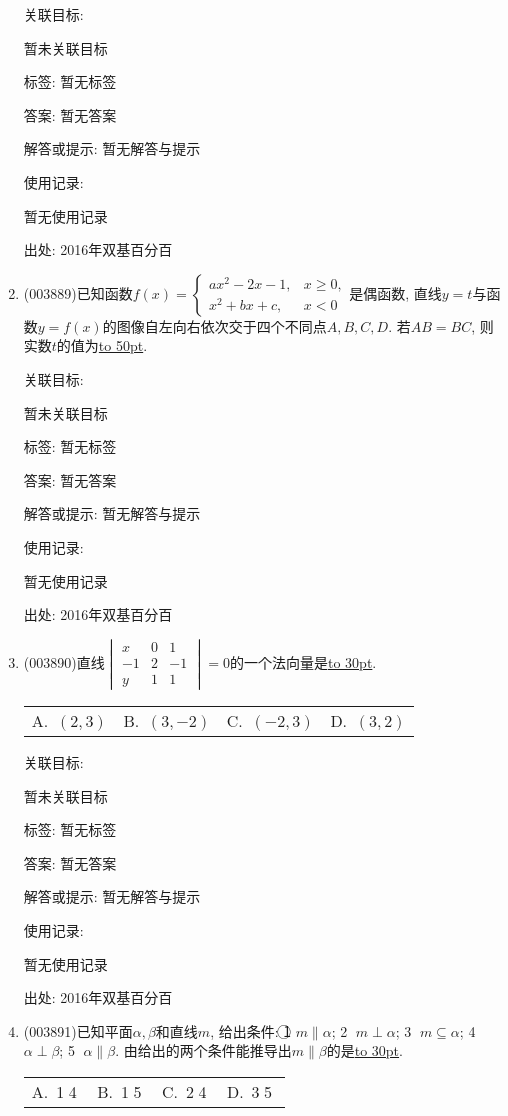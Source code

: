 \documentclass[10pt,a4paper]{article}
\newcommand{\blank}[1]{\underline{\hbox to #1pt{}}}
\newcommand{\fourch}[4]{\par\begin{tabular}{p{.23\textwidth}p{.23\textwidth}p{.23\textwidth}p{.23\textwidth}}
A.~#1 &B.~#2& C.~#3& D.~#4
\end{tabular}}
\begin{document}
\begin{enumerate}[1.]
关联目标:

暂未关联目标



标签: 暂无标签

答案: 暂无答案

解答或提示: 暂无解答与提示

使用记录:

暂无使用记录


出处: 2016年双基百分百
\item { (003889)}已知函数$f(x)=\begin{cases}ax^2-2x-1, & x\ge 0,\\ x^2+bx+c, & x<0\end{cases}$是偶函数, 直线$y=t$与函数$y=f(x)$的图像自左向右依次交于四个不同点$A,B,C,D$. 若$AB=BC$, 则实数$t$的值为\blank{50}.


关联目标:

暂未关联目标



标签: 暂无标签

答案: 暂无答案

解答或提示: 暂无解答与提示

使用记录:

暂无使用记录


出处: 2016年双基百分百
\item { (003890)}直线$\begin{vmatrix}
x & 0 & 1\\-1 & 2 & -1\\y & 1 & 1
\end{vmatrix}=0$的一个法向量是\blank{30}.
\fourch{$(2,3)$}{$(3,-2)$}{$(-2,3)$}{$(3,2)$}


关联目标:

暂未关联目标



标签: 暂无标签

答案: 暂无答案

解答或提示: 暂无解答与提示

使用记录:

暂无使用记录


出处: 2016年双基百分百
\item { (003891)}已知平面$\alpha,\beta$和直线$m$, 给出条件: \textcircled{1} $m\parallel \alpha$; \textcircled{2} $m\perp \alpha$; \textcircled{3} $m\subseteq \alpha$; \textcircled{4} $\alpha\perp \beta$; \textcircled{5} $\alpha\parallel\beta$. 由给出的两个条件能推导出$m\parallel \beta$的是\blank{30}.
\fourch{\textcircled{1}\textcircled{4}}{\textcircled{1}\textcircled{5}}{\textcircled{2}\textcircled{4}}{\textcircled{3}\textcircled{5}}



\end{enumerate}
\end{document}
